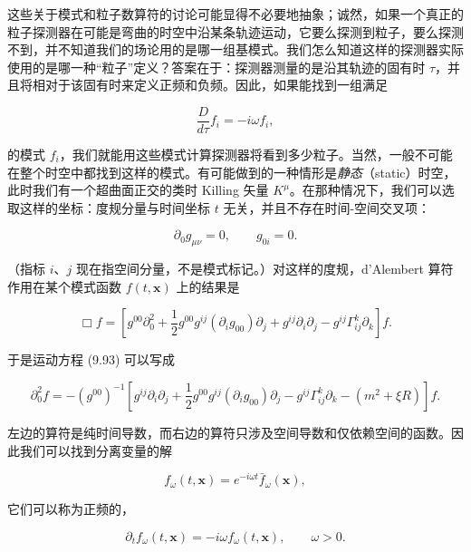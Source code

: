 这些关于模式和粒子数算符的讨论可能显得不必要地抽象；诚然，如果一个真正的粒子探测器在可能是弯曲的时空中沿某条轨迹运动，它要么探测到粒子，要么探测不到，并不知道我们的场论用的是哪一组基模式。我们怎么知道这样的探测器实际使用的是哪一种“粒子”定义？答案在于：探测器测量的是沿其轨迹的固有时 $\tau$，并且将相对于该固有时来定义正频和负频。因此，如果能找到一组满足

\begin{equation*}
\frac{D}{d\tau}f_i = -i\omega f_i,
\tag{9.112}
\end{equation*}

的模式 $f_i$，我们就能用这些模式计算探测器将看到多少粒子。当然，一般不可能在整个时空中都找到这样的模式。有可能做到的一种情形是\emph{静态}（static）时空，此时我们有一个超曲面正交的类时 Killing 矢量 $K^{\mu}$。在那种情况下，我们可以选取这样的坐标：度规分量与时间坐标 $t$ 无关，并且不存在时间-空间交叉项：

\begin{equation*}
\partial_0 g_{\mu\nu} = 0, \qquad g_{0i} = 0.
\tag{9.113}
\end{equation*}

（指标 $i$、$j$ 现在指空间分量，不是模式标记。）对这样的度规，d'Alembert 算符作用在某个模式函数 $f(t,\mathbf{x})$ 上的结果是

\begin{equation*}
\Box f = \left[g^{00}\partial_0^2 + \frac{1}{2}g^{00}g^{ij}(\partial_i g_{00})\partial_j + g^{ij}\partial_i\partial_j - g^{ij}\Gamma^{k}_{ij}\partial_k\right]f.
\tag{9.114}
\end{equation*}

于是运动方程 (9.93) 可以写成

\begin{equation*}
\partial_0^2 f = -\left(g^{00}\right)^{-1}\left[g^{ij}\partial_i\partial_j + \frac{1}{2}g^{00}g^{ij}(\partial_i g_{00})\partial_j - g^{ij}\Gamma^{k}_{ij}\partial_k - \left(m^2 + \xi R\right)\right]f.
\tag{9.115}
\end{equation*}

左边的算符是纯时间导数，而右边的算符只涉及空间导数和仅依赖空间的函数。因此我们可以找到分离变量的解

\begin{equation*}
f_{\omega}(t,\mathbf{x}) = e^{-i\omega t}\bar{f}_{\omega}(\mathbf{x}),
\tag{9.116}
\end{equation*}

它们可以称为正频的，

\begin{equation*}
\partial_t f_{\omega}(t,\mathbf{x}) = -i\omega f_{\omega}(t,\mathbf{x}), \qquad \omega > 0.
\tag{9.117}
\end{equation*}

